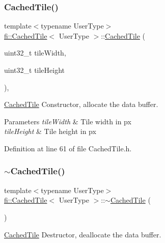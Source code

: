 \subsubsection{\texorpdfstring{Cached\+Tile()}{CachedTile()}}
{\footnotesize\ttfamily template$<$typename User\+Type$>$ \\
\hyperlink{classfi_1_1CachedTile}{fi\+::\+Cached\+Tile}$<$ User\+Type $>$\+::\hyperlink{classfi_1_1CachedTile}{Cached\+Tile} (\begin{DoxyParamCaption}\item[{uint32\+\_\+t}]{tile\+Width,  }\item[{uint32\+\_\+t}]{tile\+Height }\end{DoxyParamCaption})\hspace{0.3cm}{\ttfamily [inline]}, {\ttfamily [explicit]}}



\hyperlink{classfi_1_1CachedTile}{Cached\+Tile} Constructor, allocate the data buffer. 


\begin{DoxyParams}{Parameters}
{\em tile\+Width} & Tile width in px \\
\hline
{\em tile\+Height} & Tile height in px \\
\hline
\end{DoxyParams}


Definition at line 61 of file Cached\+Tile.\+h.

\mbox{\label{classfi_1_1CachedTile_a1fb901c94fe2ad2f880e8eefa893da5d}} 
\subsubsection{\texorpdfstring{$\sim$\+Cached\+Tile()}{~CachedTile()}}
{\footnotesize\ttfamily template$<$typename User\+Type$>$ \\
\hyperlink{classfi_1_1CachedTile}{fi\+::\+Cached\+Tile}$<$ User\+Type $>$\+::$\sim$\hyperlink{classfi_1_1CachedTile}{Cached\+Tile} (\begin{DoxyParamCaption}{ }\end{DoxyParamCaption})\hspace{0.3cm}{\ttfamily [inline]}}



\hyperlink{classfi_1_1CachedTile}{Cached\+Tile} Destructor, deallocate the data buffer. 



